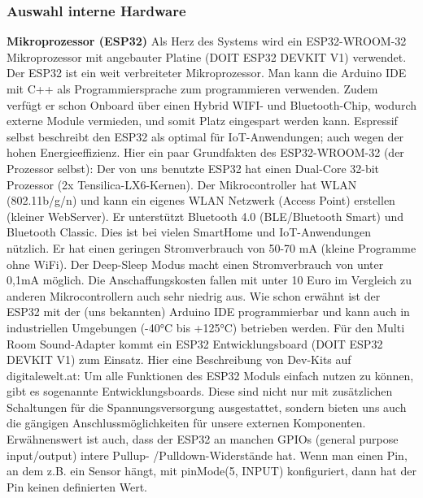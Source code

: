 \documentclass[]{article}
\begin{document}
\subsubsection{Auswahl interne Hardware}
\textbf{Mikroprozessor (ESP32)}\newline
Als Herz des Systems wird ein ESP32-WROOM-32 Mikroprozessor mit angebauter Platine (DOIT ESP32 DEVKIT V1) verwendet. Der ESP32 ist ein weit verbreiteter Mikroprozessor. Man kann die Arduino IDE mit C++ als Programmiersprache zum programmieren verwenden. Zudem verfügt er schon Onboard über einen Hybrid WIFI- und Bluetooth-Chip, wodurch externe Module vermieden, und somit Platz eingespart werden kann. Espressif selbst beschreibt den ESP32 als optimal für IoT-Anwendungen; auch wegen der hohen Energieeffizienz.\newline
Hier ein paar Grundfakten des ESP32-WROOM-32 (der Prozessor selbst):\newline
Der von uns benutzte ESP32 hat einen Dual-Core 32-bit Prozessor (2x Tensilica-LX6-Kernen). Der Mikrocontroller hat WLAN (802.11b/g/n) und kann ein eigenes WLAN Netzwerk (Access Point) erstellen (kleiner WebServer). Er unterstützt Bluetooth 4.0 (BLE/Bluetooth Smart) und Bluetooth Classic. Dies ist bei vielen SmartHome und IoT-Anwendungen nützlich. Er hat einen geringen Stromverbrauch von 50-70 mA (kleine Programme ohne WiFi). Der Deep-Sleep Modus macht einen Stromverbrauch von unter 0,1mA möglich. Die Anschaffungskosten fallen mit unter 10 Euro im Vergleich zu anderen Mikrocontrollern auch sehr niedrig aus.\newline
Wie schon erwähnt ist der ESP32 mit der (uns bekannten) Arduino IDE programmierbar und kann auch in industriellen Umgebungen (-40°C bis +125°C) betrieben werden.\newline
Für den Multi Room Sound-Adapter kommt ein ESP32 Entwicklungsboard (DOIT ESP32 DEVKIT V1) zum Einsatz.\newline
Hier eine Beschreibung von Dev-Kits auf digitalewelt.at: \glqq Um alle Funktionen des ESP32 Moduls einfach nutzen zu können, gibt es sogenannte Entwicklungsboards. Diese sind nicht nur mit zusätzlichen Schaltungen für die Spannungsversorgung ausgestattet, sondern bieten uns auch die gängigen Anschlussmöglichkeiten für unsere externen Komponenten.\grqq{} \newline
Erwähnenswert ist auch, dass der ESP32 an manchen GPIOs (general purpose input/output) intere Pullup- /Pulldown-Widerstände hat. \glqq Wenn man einen Pin, an dem z.B. ein Sensor hängt, mit pinMode(5, INPUT) konfiguriert, dann hat der Pin keinen definierten Wert.
\end{document}

